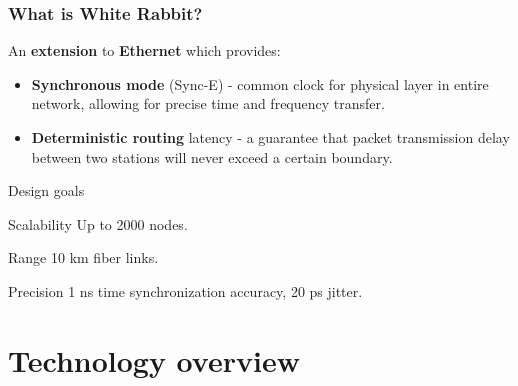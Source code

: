 \documentclass[compress,red]{beamer}
\begin{document}
\frame
{
  \frametitle{What is White Rabbit?}

\begin{block}{}
  An \textbf{extension} to \textbf{Ethernet} which provides:
  \begin{itemize}
  \item \textbf{Synchronous mode} (Sync-E) - common clock for physical layer in entire network, allowing for precise time and frequency transfer.

\item \textbf{Deterministic routing} latency - a guarantee that packet transmission delay between two stations will never exceed a certain boundary.
\end{itemize}
\end{block}

}

\begin{frame}{Design goals}
\begin{block}{Scalability}
Up to 2000 nodes.
\end{block}

\begin{block}{Range}
10 km fiber links.
\end{block}

\begin{block}{Precision}
1 ns time synchronization accuracy, 20 ps jitter.
\end{block}

\end{frame}

\section{Technology overview}


\end{document}
